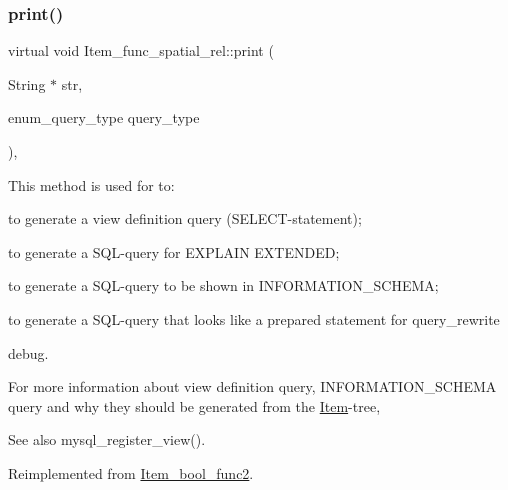 \subsubsection{\texorpdfstring{print()}{print()}}
{\footnotesize\ttfamily virtual void Item\+\_\+func\+\_\+spatial\+\_\+rel\+::print (\begin{DoxyParamCaption}\item[{String $\ast$}]{str,  }\item[{enum\+\_\+query\+\_\+type}]{query\+\_\+type }\end{DoxyParamCaption})\hspace{0.3cm}{\ttfamily [inline]}, {\ttfamily [virtual]}}

This method is used for to\+:
\begin{DoxyItemize}
\item to generate a view definition query (S\+E\+L\+E\+CT-\/statement);
\item to generate a S\+QL-\/query for E\+X\+P\+L\+A\+IN E\+X\+T\+E\+N\+D\+ED;
\item to generate a S\+QL-\/query to be shown in I\+N\+F\+O\+R\+M\+A\+T\+I\+O\+N\+\_\+\+S\+C\+H\+E\+MA;
\item to generate a S\+QL-\/query that looks like a prepared statement for query\+\_\+rewrite
\item debug.
\end{DoxyItemize}

For more information about view definition query, I\+N\+F\+O\+R\+M\+A\+T\+I\+O\+N\+\_\+\+S\+C\+H\+E\+MA query and why they should be generated from the \mbox{\hyperlink{classItem}{Item}}-\/tree, \begin{DoxySeeAlso}{See also}
mysql\+\_\+register\+\_\+view(). 
\end{DoxySeeAlso}


Reimplemented from \mbox{\hyperlink{classItem__bool__func2_a12469a240720c26bef325a4ee5b02f50}{Item\+\_\+bool\+\_\+func2}}.

\mbox{\label{classItem__func__spatial__rel_abd51852f8be3c294137db766a871888b}} 
